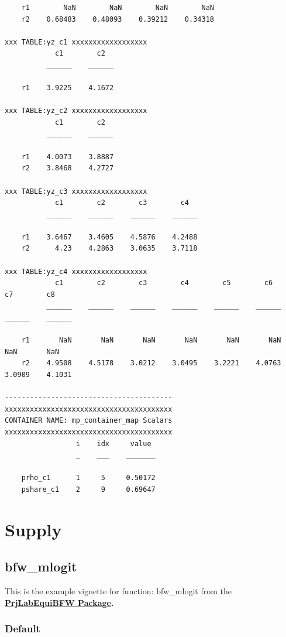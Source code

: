 \documentclass[
]{book}
\begin{document}
\begin{verbatim}
    r1        NaN        NaN        NaN        NaN
    r2    0.68483    0.48093    0.39212    0.34318

xxx TABLE:yz_c1 xxxxxxxxxxxxxxxxxx
            c1        c2  
          ______    ______

    r1    3.9225    4.1672

xxx TABLE:yz_c2 xxxxxxxxxxxxxxxxxx
            c1        c2  
          ______    ______

    r1    4.0073    3.8887
    r2    3.8468    4.2727

xxx TABLE:yz_c3 xxxxxxxxxxxxxxxxxx
            c1        c2        c3        c4  
          ______    ______    ______    ______

    r1    3.6467    3.4605    4.5876    4.2488
    r2      4.23    4.2863    3.0635    3.7118

xxx TABLE:yz_c4 xxxxxxxxxxxxxxxxxx
            c1        c2        c3        c4        c5        c6        c7        c8  
          ______    ______    ______    ______    ______    ______    ______    ______

    r1       NaN       NaN       NaN       NaN       NaN       NaN       NaN       NaN
    r2    4.9508    4.5178    3.0212    3.0495    3.2221    4.0763    3.0909    4.1031

----------------------------------------
xxxxxxxxxxxxxxxxxxxxxxxxxxxxxxxxxxxxxxxx
CONTAINER NAME: mp_container_map Scalars
xxxxxxxxxxxxxxxxxxxxxxxxxxxxxxxxxxxxxxxx
                 i    idx     value 
                 _    ___    _______

    prho_c1      1     5     0.50172
    pshare_c1    2     9     0.69647
\end{verbatim}

\hypertarget{supply}{%
\chapter{Supply}\label{supply}}

\hypertarget{bfw_mlogit}{%
\section{bfw\_mlogit}\label{bfw_mlogit}}

This is the example vignette for function: bfw\_mlogit from the
\href{https://fanwangecon.github.io/PrjLabEquiBFW/}{\textbf{PrjLabEquiBFW
Package}}\textbf{.}

\hypertarget{default}{%
\subsection{Default}\label{default}}
\end{document}
